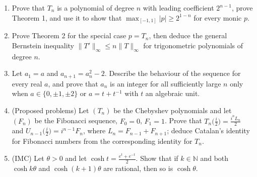 \documentclass[11pt,a4paper]{article}
\renewcommand{\le}{\leqslant}
\renewcommand{\ge}{\geqslant}
\theoremstyle{ruthm}
\begin{document}
\begin{enumerate}[itemsep=0.6em]
\item Prove that $T_n$ is a polynomial of degree $n$ with leading coefficient $2^{n-1}$, prove
Theorem 1, and use it to show that $\max_{[-1,1]}|p|\ge2^{1-n}$ for every monic $p$.

\item Prove Theorem 2 for the special case $p=T_n$, then deduce the general Bernstein inequality
$\|T'\|_\infty\le n\|T\|_\infty$ for trigonometric polynomials of degree $n$.

\item Let $a_1=a$ and $a_{n+1}=a_n^2-2$. Describe the behaviour of the sequence for every real $a$,
and prove that $a_n$ is an integer for all sufficiently large $n$ only when $a\in\{0,\pm1,\pm2\}$ or
$a=t+t^{-1}$ with $t$ an algebraic unit.

\item (Proposed problems) Let $(T_n)$ be the Chebyshev polynomials and let $(F_n)$ be the Fibonacci
sequence, $F_0=0$, $F_1=1$. Prove that $T_n\bigl(\frac i2\bigr)=\frac{i^nL_n}2$ and
$U_{n-1}\bigl(\frac i2\bigr)=i^{n-1}F_n$, where $L_n=F_{n-1}+F_{n+1}$; deduce Catalan's identity for
Fibonacci numbers from the corresponding identity for $T_n$.

\item (IMC) Let $\theta>0$ and let $\cosh t=\frac{e^t+e^{-t}}2$. Show that if $k\in\mathbb N$ and both
$\cosh k\theta$ and $\cosh(k+1)\theta$ are rational, then so is $\cosh\theta$.
\end{enumerate}
\end{document}
